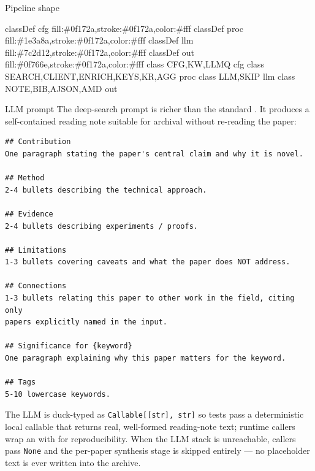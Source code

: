\documentclass[
  ignorenonframetext,
]{beamer}
\newenvironment{Shaded}{}{}
\newcommand{\NormalTok}[1]{#1}
\begin{document}
\begin{frame}{Pipeline shape}
\begin{Shaded}
\begin{Highlighting}[]
\NormalTok{    classDef cfg fill:\#0f172a,stroke:\#0f172a,color:\#fff}
\NormalTok{    classDef proc fill:\#1e3a8a,stroke:\#0f172a,color:\#fff}
\NormalTok{    classDef llm fill:\#7c2d12,stroke:\#0f172a,color:\#fff}
\NormalTok{    classDef out fill:\#0f766e,stroke:\#0f172a,color:\#fff}
\NormalTok{    class CFG,KW,LLMQ cfg}
\NormalTok{    class SEARCH,CLIENT,ENRICH,KEYS,KR,AGG proc}
\NormalTok{    class LLM,SKIP llm}
\NormalTok{    class NOTE,BIB,AJSON,AMD out}
\end{Highlighting}
\end{Shaded}
\end{frame}

\begin{frame}{LLM prompt}
\protect{}\label{llm-prompt}
The deep-search prompt is richer than the standard
. It produces a self-contained
reading note suitable for archival without re-reading the paper:

\begin{verbatim}
## Contribution
One paragraph stating the paper's central claim and why it is novel.

## Method
2-4 bullets describing the technical approach.

## Evidence
2-4 bullets describing experiments / proofs.

## Limitations
1-3 bullets covering caveats and what the paper does NOT address.

## Connections
1-3 bullets relating this paper to other work in the field, citing only
papers explicitly named in the input.

## Significance for {keyword}
One paragraph explaining why this paper matters for the keyword.

## Tags
5-10 lowercase keywords.
\end{verbatim}

The LLM is duck-typed as \texttt{Callable{[}{[}str{]},\ str{]}} so tests
pass a deterministic local callable that returns real, well-formed
reading-note text; runtime callers wrap an
 with
 for reproducibility. When the LLM
stack is unreachable, callers pass \texttt{None} and the per-paper
synthesis stage is skipped entirely --- no placeholder text is ever
written into the archive.
\end{frame}
\end{document}
